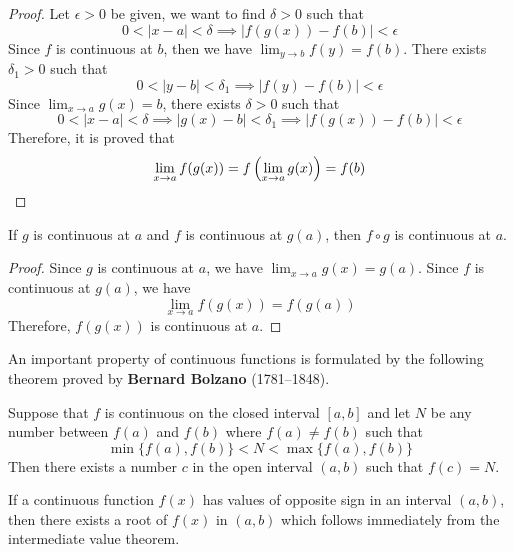 \begin{proof}
    Let \(\epsilon>0\) be given, we want to find \(\delta>0\) such that
    \[0<|x-a|<\delta\implies|f(g(x))-f(b)|<\epsilon\]
    Since \(f\) is continuous at \(b\), then we have \(\lim_{y\to b}f(y)=f(b)\).
    There exists \(\delta_1>0\) such that
    \[0<|y-b|<\delta_1\implies|f(y)-f(b)|<\epsilon\]
    Since \(\lim_{x\to a}g(x)=b\), there exists \(\delta>0\) such that
    \[0<|x-a|<\delta\implies|g(x)-b|<\delta_1\implies|f(g(x))-f(b)|<\epsilon\]
    Therefore, it is proved that
    \[\lim_{x\to a}f(g(x))=f\left(\lim_{x\to a}g(x)\right)=f(b)\qedhere\]
\end{proof}
\begin{theorem}
    If \(g\) is continuous at \(a\) and \(f\) is continuous at \(g(a)\), then
    \(f\circ g\) is continuous at \(a\).
\end{theorem}
\begin{proof}
    Since \(g\) is continuous at \(a\), we have \(\lim_{x\to a}g(x)=g(a)\).
    Since \(f\) is continuous at \(g(a)\), we have
    \[\lim_{x\to a}f(g(x))=f(g(a))\]
    Therefore, \(f(g(x))\) is continuous at \(a\).
\end{proof}
An important property of continuous functions is formulated by the following
theorem proved by \textbf{Bernard Bolzano} (1781--1848).
\begin{theorem}
    Suppose that \(f\) is continuous on the closed interval \([a,b]\) and let
    \(N\) be any number between \(f(a)\) and \(f(b)\) where \(f(a)\neq f(b)\)
    such that \[\min\{f(a),f(b)\}<N<\max\{f(a),f(b)\}\]
    Then there exists a number \(c\) in the open interval \((a,b)\) such that
    \(f(c)=N\).
\end{theorem}
If a continuous function \(f(x)\) has values of opposite sign in an interval
\((a,b)\), then there exists a root of \(f(x)\) in \((a,b)\) which follows immediately from
the intermediate value theorem.